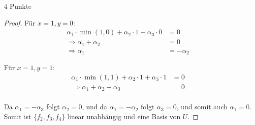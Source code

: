\documentclass{../problemset}
\begin{document}
\begin{problem}{4 Punkte}
\begin{proof}
	Für $x = 1, y = 0$:
	\begin{align*}
		\alpha_1 \cdot \min(1, 0) + \alpha_2 \cdot 1 + \alpha_3 \cdot 0 & = 0         \\
		\Rightarrow \alpha_1 + \alpha_2                                 & = 0         \\
		\Rightarrow \alpha_1                                            & = -\alpha_2
	\end{align*}

	Für $x = 1, y = 1$:
	\begin{align*}
		\alpha_1 \cdot \min(1, 1) + \alpha_2 \cdot 1 + \alpha_3 \cdot 1 & = 0 \\
		\Rightarrow \alpha_1 + \alpha_2 + \alpha_3                      & = 0 \\
	\end{align*}

	Da $\alpha_1 = - \alpha_3$ folgt $\alpha_2 = 0$, und da $\alpha_1 = - \alpha_2$ folgt $\alpha_3 = 0$, und somit auch $\alpha_1 = 0$.
	Somit ist $\{f_2, f_3, f_4\}$ linear unabhängig und eine Basis von $U$.
\end{proof}
\end{problem}
\end{document}
